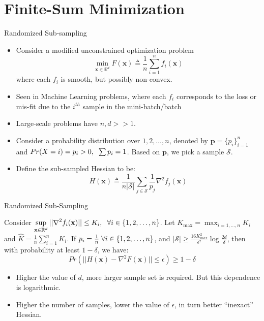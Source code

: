 \documentclass{beamer}
\newcommand{\h}{\nabla^{2}}
\newcommand{\xbold}{\mathbf{x}}
\begin{document}
\section{Finite-Sum Minimization}
\begin{frame}{Randomized Sub-sampling}
\begin{itemize}
\item<1->{Consider a modified unconstrained optimization problem
  \begin{equation}
    \min_{\xbold \in \mathbb{R}^{d}} F(\xbold) \triangleq \frac{1}{n}\displaystyle \sum_{i=1}^{n} f_{i}(\xbold)
  \end{equation}
where each \(f_{i}\) is smooth, but possibly non-convex.}
\item<2->{Seen in Machine Learning problems, where each \(f_{i}\) corresponds to the loss or mis-fit due to the \(i^{th}\) sample in the mini-batch/batch}
\item<3->{Large-scale problems have \(n, d >> 1\).}
\item<4->{Consider a probability distribution over \({1, 2, \ldots, n}\), denoted by \(\mathbf{p} = \{p_{i}\}_{i=1}^{n}\) and \(Pr(X = i) = p_{i} > 0, \hspace{2mm} \sum p_{i} = 1\). Based on \(\mathbf{p}\), we pick a sample \(\mathcal{S}\).}
\item<5->{Define the sub-sampled Hessian to be:
  \begin{equation}
    H(\xbold) \triangleq \frac{1}{n|\mathcal{S}|}\sum_{j \in \mathcal{S}} \frac{1}{p_{j}} \h f_{j}(\xbold)
  \end{equation}
}
\end{itemize}
\end{frame}

\begin{frame}{Randomized Sub-Sampling}
\begin{theorem}
Consider \(\displaystyle \sup_{\xbold\in\mathbb{R}^{d}} ||\h f_{i}(\xbold)|| \leq K_{i}, \hspace{2mm} \forall i \in \{1, 2, \ldots, n\}\). Let \(\displaystyle K_{\max} = \max_{i=1,\ldots, n} K_{i}\) and \(\hat{K} = \frac{1}{n} \displaystyle \sum_{i=1}^{n} K_{i}\). If \(p_{i} = \frac{1}{n} \hspace{1mm} \forall i \in \{1, 2, \ldots, n\}\), and \(|\mathcal{S}| \geq \frac{16K^{2}_{max}}{\epsilon^{2}}\log\frac{2d}{\delta} \), then with probability at least \(1 - \delta\), we have:
\begin{equation}
Pr\left(||H(\xbold) - \h F(\xbold)|| \leq \epsilon\right) \geq 1 - \delta
\end{equation}
\end{theorem}
\pause
{}
\begin{itemize}
\item<3->{Higher the value of \(d\), more larger sample set is required. But this dependence is logarithmic.}
\item<4->{Higher the number of samples, lower the value of \(\epsilon\), in turn better ``inexact'' Hessian.}
\end{itemize}
\end{frame}
\end{document}
